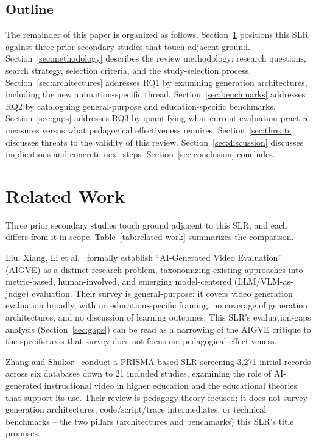 \documentclass[journal]{IEEEtran}
\begin{document}
\subsection{Outline}

The remainder of this paper is organized as follows. Section~\ref{sec:related} positions this SLR against three prior secondary studies that touch adjacent ground. Section~\ref{sec:methodology} describes the review methodology: research questions, search strategy, selection criteria, and the study-selection process. Section~\ref{sec:architectures} addresses RQ1 by examining generation architectures, including the new animation-specific thread. Section~\ref{sec:benchmarks} addresses RQ2 by cataloguing general-purpose and education-specific benchmarks. Section~\ref{sec:gaps} addresses RQ3 by quantifying what current evaluation practice measures versus what pedagogical effectiveness requires. Section~\ref{sec:threats} discusses threats to the validity of this review. Section~\ref{sec:discussion} discusses implications and concrete next steps. Section~\ref{sec:conclusion} concludes.

\section{Related Work}
\label{sec:related}

Three prior secondary studies touch ground adjacent to this SLR, and each differs from it in scope. Table~\ref{tab:related-work} summarizes the comparison.

Liu, Xiang, Li et al.~\cite{liu2024aigve} formally establish ``AI-Generated Video Evaluation'' (AIGVE) as a distinct research problem, taxonomizing existing approaches into metric-based, human-involved, and emerging model-centered (LLM/VLM-as-judge) evaluation. Their survey is general-purpose: it covers video generation evaluation broadly, with no education-specific framing, no coverage of generation architectures, and no discussion of learning outcomes. This SLR's evaluation-gaps analysis (Section~\ref{sec:gaps}) can be read as a narrowing of the AIGVE critique to the specific axis that survey does not focus on: pedagogical effectiveness.

Zhang and Shukor~\cite{zhang2025roleaivideos} conduct a PRISMA-based SLR screening 3{,}271 initial records across six databases down to 21 included studies, examining the role of AI-generated instructional video in higher education and the educational theories that support its use. Their review is pedagogy-theory-focused; it does not survey generation architectures, code/script/trace intermediates, or technical benchmarks -- the two pillars (architectures and benchmarks) this SLR's title promises.
\end{document}
